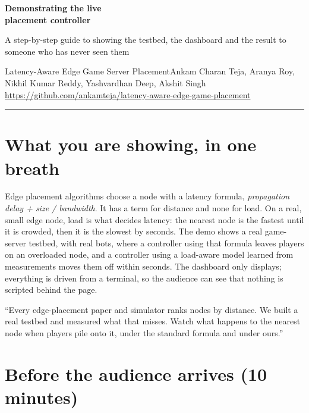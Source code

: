 \documentclass[11pt,a4paper]{article}
\begin{document}
{\raggedright\Huge\bfseries Demonstrating the live\\placement controller\par}
\vspace{4pt}
{\large\color{muted} A step-by-step guide to showing the testbed, the dashboard and the result to someone who has never seen them}\par
\vspace{2pt}
{\small\color{muted} Latency-Aware Edge Game Server Placement\quad\textbullet\quad Ankam Charan Teja, Aranya Roy, Nikhil Kumar Reddy, Yashvardhan Deep, Akshit Singh\\
\url{https://github.com/ankamteja/latency-aware-edge-game-placement}}\par
\vspace{6pt}
{\color{rule}\hrule}

\section*{What you are showing, in one breath}

Edge placement algorithms choose a node with a latency formula,
\emph{propagation delay + size / bandwidth}. It has a term for distance and
none for load. On a real, small edge node, load is what decides latency: the
nearest node is the fastest until it is crowded, then it is the slowest by
seconds. The demo shows a real game-server testbed, with real bots, where a
controller using that formula leaves players on an overloaded node, and a
controller using a load-aware model learned from measurements moves them
off within seconds. The dashboard only displays; everything is driven from a
terminal, so the audience can see that nothing is scripted behind the page.

\begin{sayit}
``Every edge-placement paper and simulator ranks nodes by distance. We built a
real testbed and measured what that misses. Watch what happens to the nearest
node when players pile onto it, under the standard formula and under ours.''
\end{sayit}

\section{Before the audience arrives (10 minutes)}
\end{document}
